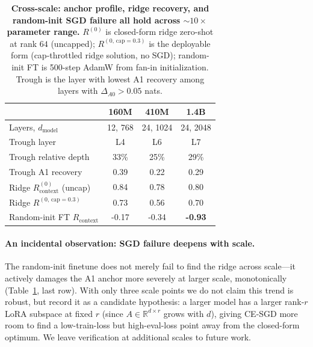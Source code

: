 \begin{table}[t]
\centering\small
\caption{\textbf{Cross-scale: anchor profile, ridge recovery, and random-init
SGD failure all hold across $\sim 10\times$ parameter range.}
$R^{(0)}$ is closed-form ridge zero-shot at rank $64$ (uncapped);
$R^{(0,\,\mathrm{cap}=0.3)}$ is the deployable form (cap-throttled
ridge solution, no SGD); random-init FT is 500-step AdamW from
fan-in initialization. Trough is the layer with lowest A1 recovery
among layers with $\Delta_{A0} > 0.05$ nats.}
\label{tab:cross-scale}
\begin{tabular}{lccc}
\toprule
 & 160M & 410M & 1.4B \\
\midrule
Layers, $d_\mathrm{model}$              & 12, 768   & 24, 1024  & 24, 2048 \\
Trough layer                            & L4        & L6        & L7 \\
Trough relative depth                   & 33\%      & 25\%      & 29\% \\
Trough A1 recovery                      & 0.39      & 0.22      & 0.29 \\
\midrule
Ridge $R^{(0)}_\mathrm{context}$ (uncap) & 0.84     & 0.78      & 0.80 \\
Ridge $R^{(0,\,\mathrm{cap}=0.3)}$       & 0.73     & 0.56      & 0.70 \\
Random-init FT $R_\mathrm{context}$      & -0.17    & -0.34     & \textbf{-0.93} \\
\bottomrule
\end{tabular}
\end{table}

\paragraph{An incidental observation: SGD failure deepens with scale.}
The random-init finetune does not merely fail to find the ridge across
scale---it actively damages the A1 anchor more severely at larger
scale, monotonically (Table~\ref{tab:cross-scale}, last row). With
only three scale points we do not claim this trend is robust, but
record it as a candidate hypothesis: a larger model has a larger
rank-$r$ LoRA subspace at fixed $r$ (since $A \in \mathbb{R}^{d \times r}$
grows with $d$), giving CE-SGD more room to find a low-train-loss but
high-eval-loss point away from the closed-form optimum. We leave
verification at additional scales to future work.
